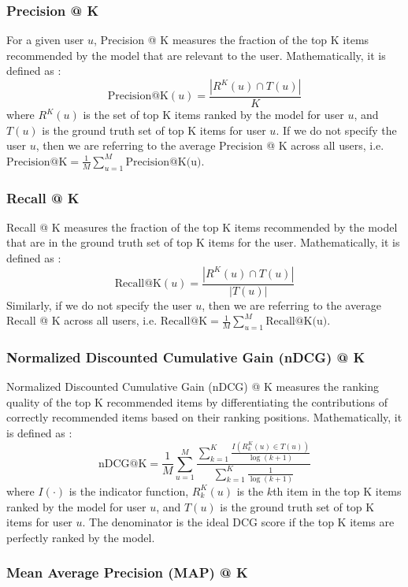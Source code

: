 \documentclass{article}
\begin{document}
\subsubsection{Precision @ K}

For a given user $u$, Precision @ K measures the fraction of the top K items recommended by the model that are relevant to the user. Mathematically, it is defined as \cite{survey}:
$$
\mbox{Precision@K}(u) = \frac{| R^K(u) \cap T(u) |}{K}
$$
where $R^K(u)$ is the set of top K items ranked by the model for user $u$, and $T(u)$ is the ground truth set of top K items for user $u$. If we do not specify the user $u$, then we are referring to the average Precision @ K across all users, i.e. $\mbox{Precision@K} = \frac{1}{M} \sum_{u = 1}^M \mbox{Precision@K(u)}$.

\subsubsection{Recall @ K}

Recall @ K measures the fraction of the top K items recommended by the model that are in the ground truth set of top K items for the user. Mathematically, it is defined as \cite{survey}:
$$
\mbox{Recall@K}(u) = \frac{| R^K(u) \cap T(u) |}{|T(u)|}
$$
Similarly, if we do not specify the user $u$, then we are referring to the average Recall @ K across all users, i.e. $\mbox{Recall@K} = \frac{1}{M} \sum_{u = 1}^M \mbox{Recall@K(u)}$.

\subsubsection{Normalized Discounted Cumulative Gain (nDCG) @ K}

Normalized Discounted Cumulative Gain (nDCG) @ K measures the ranking quality of the top K recommended items by differentiating the contributions of correctly recommended items based on their ranking positions. Mathematically, it is defined as \cite{survey}:
$$
\mbox{nDCG@K} = \frac{1}{M} \sum_{u = 1}^M \frac{\sum_{k = 1}^K \frac{I(R^K_k(u) \in T(u))}{\log(k + 1)}}{\sum_{k = 1}^K \frac{1}{ \log(k + 1)}}
$$
where $I(\cdot)$ is the indicator function, $R^K_k(u)$ is the $k$th item in the top K items ranked by the model for user $u$, and $T(u)$ is the ground truth set of top K items for user $u$. The denominator is the ideal DCG score if the top K items are perfectly ranked by the model.

\subsubsection{Mean Average Precision (MAP) @ K}
\end{document}
